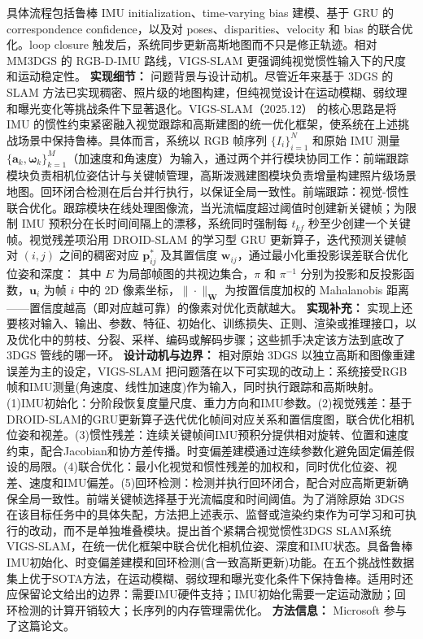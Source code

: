 具体流程包括鲁棒 IMU initialization、time-varying bias 建模、基于 GRU 的 correspondence confidence，以及对 poses、disparities、velocity 和 bias 的联合优化。loop closure 触发后，系统同步更新高斯地图而不只是修正轨迹。相对 MM3DGS 的 RGB-D-IMU 路线，VIGS-SLAM 更强调纯视觉惯性输入下的尺度和运动稳定性。
\textbf{实现细节：} 问题背景与设计动机。尽管近年来基于 3DGS 的 SLAM 方法已实现稠密、照片级的地图构建，但纯视觉设计在运动模糊、弱纹理和曝光变化等挑战条件下显著退化。VIGS-SLAM（2025.12） 的核心思路是将 IMU 的惯性约束紧密融入视觉跟踪和高斯建图的统一优化框架，使系统在上述挑战场景中保持鲁棒。具体而言，系统以 RGB 帧序列 $\{I_i\}_{i=1}^N$ 和原始 IMU 测量 $\{\mathbf{a}_k, \boldsymbol{\omega}_k\}_{k=1}^M$（加速度和角速度）为输入，通过两个并行模块协同工作：前端跟踪模块负责相机位姿估计与关键帧管理，高斯泼溅建图模块负责增量构建照片级场景地图。回环闭合检测在后台并行执行，以保证全局一致性。前端跟踪：视觉-惯性联合优化。跟踪模块在线处理图像流，当光流幅度超过阈值时创建新关键帧；为限制 IMU 预积分在长时间间隔上的漂移，系统同时强制每 $t_{kf}$ 秒至少创建一个关键帧。视觉残差项沿用 DROID-SLAM 的学习型 GRU 更新算子，迭代预测关键帧对 $(i, j)$ 之间的稠密对应 $\mathbf{p}^{*}_{ij}$ 及其置信度 $\mathbf{w}_{ij}$，通过最小化重投影误差联合优化位姿和深度： 其中 $E$ 为局部帧图的共视边集合，$\pi$ 和 $\pi^{-1}$ 分别为投影和反投影函数，$\mathbf{u}_i$ 为帧 $i$ 中的 2D 像素坐标，$\| \cdot \|_{\mathbf{W}}$ 为按置信度加权的 Mahalanobis 距离——置信度越高（即对应越可靠）的像素对优化贡献越大。
\textbf{实现补充：} 实现上还要核对输入、输出、参数、特征、初始化、训练损失、正则、渲染或推理接口，以及优化中的剪枝、分裂、采样、编码或解码步骤；这些抓手决定该方法到底改了 3DGS 管线的哪一环。
\textbf{设计动机与边界：} 相对原始 3DGS 以独立高斯和图像重建误差为主的设定，VIGS-SLAM 把问题落在以下可实现的改动上：系统接受RGB帧和IMU测量(角速度、线性加速度)作为输入，同时执行跟踪和高斯映射。(1)IMU初始化：分阶段恢复度量尺度、重力方向和IMU参数。(2)视觉残差：基于DROID-SLAM的GRU更新算子迭代优化帧间对应关系和置信度图，联合优化相机位姿和视差。(3)惯性残差：连续关键帧间IMU预积分提供相对旋转、位置和速度约束，配合Jacobian和协方差传播。时变偏差建模通过连续参数化避免固定偏差假设的局限。(4)联合优化：最小化视觉和惯性残差的加权和，同时优化位姿、视差、速度和IMU偏差。(5)回环检测：检测并执行回环闭合，配合对应高斯更新确保全局一致性。前端关键帧选择基于光流幅度和时间阈值。为了消除原始 3DGS 在该目标任务中的具体失配，方法把上述表示、监督或渲染约束作为可学习和可执行的改动，而不是单独堆叠模块。提出首个紧耦合视觉惯性3DGS SLAM系统VIGS-SLAM，在统一优化框架中联合优化相机位姿、深度和IMU状态。具备鲁棒IMU初始化、时变偏差建模和回环检测(含一致高斯更新)功能。在五个挑战性数据集上优于SOTA方法，在运动模糊、弱纹理和曝光变化条件下保持鲁棒。适用时还应保留论文给出的边界：需要IMU硬件支持；IMU初始化需要一定运动激励；回环检测的计算开销较大；长序列的内存管理需优化。
\textbf{方法信息：} Microsoft 参与了这篇论文。



